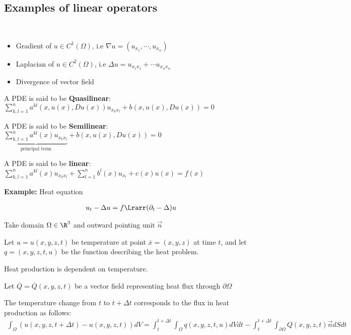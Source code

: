 \subsection{Examples of linear operators}\hfill\\
\begin{itemize}
  \item Gradient of $u\in C^1(\Omega)$, i.e $\nabla u = (u_{x_1}, \cdots, u_{x_n})$
  \item Laplacian of $u\in C^2(\Omega)$, i.e $\Delta u = u_{x_1x_1}+\cdots u_{x_nx_n}$
  \item Divergence of vector field
\end{itemize}
\par\bigskip
\begin{theo}{}
  A PDE is said to be \textbf{Quasilinear}: $\sum_{k,l = 1}^{n}a^{kl}(x,u(x), Du(x))u_{x_kx_l}+b(x,u(x),Du(x)) = 0$
  \par\bigskip
  \noindent A PDE is said to be \textbf{Semilinear}: $\underbrace{\sum_{k,l = 1}^{n}a^{kl}(x)u_{x_kx_l}}_{\text{principal term}}+b(x,u(x),Du(x)) = 0$
  \par\bigskip
  \noindent A PDE is said to be \textbf{linear}: $\sum_{k,l=1}^{n}a^{kl}(x)u_{x_kx_l}+\sum_{l=1}^{n}b^l(x)u_{x_l}+c(x)u(x) = f(x)$
\end{theo}
\par\bigskip
\noindent\textbf{Example:} Heat equation\par
\begin{equation*}
  \begin{gathered}
    u_t-\Delta u = f\Lrarr (\partial_t-\Delta)u
  \end{gathered}
\end{equation*}\par
\noindent Take domain $\Omega\in\R^3$ and outward pointing unit $\overrightarrow{n}$\par
\noindent Let $u = u(x,y,z,t)$ be temperature at point $\overline{x} = (x,y,z)$ at time $t$, and let $q = (x,y,z,t,u)$ be the function describing the heat problem.\par
\noindent Heat production is dependent on temperature.\par
\noindent Let $\overline{Q} = \overline{Q}(x,y,z,t)$ be a vector field representing heat flux through $\partial \Omega$\par
\noindent The temperature change from $t$ to $t+\Delta t$ corresponds to the flux in heat production as follows:
\begin{equation*}
  \begin{gathered}
    \int_\Omega (u(x,y,z,t+\Delta t)-u(x,y,z,t))dV = \int_{t}^{t+\Delta t}\int_\Omega q(x,y,z,t,u)dVdt-\int_{t}^{t+\Delta t}\int_{\partial \Omega}Q(x,y,z,t)\overrightarrow{n}dSdt
  \end{gathered}
\end{equation*}\par
